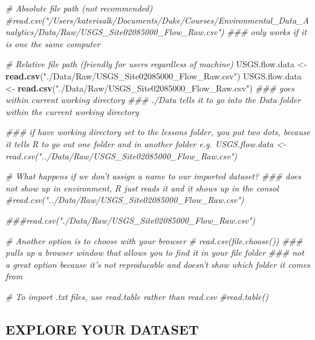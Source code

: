 \documentclass[]{article}
\newenvironment{Shaded}{\begin{snugshade}}{\end{snugshade}}
\newcommand{\CommentTok}[1]{\textcolor[rgb]{0.56,0.35,0.01}{\textit{#1}}}
\newcommand{\KeywordTok}[1]{\textcolor[rgb]{0.13,0.29,0.53}{\textbf{#1}}}
\newcommand{\NormalTok}[1]{#1}
\newcommand{\StringTok}[1]{\textcolor[rgb]{0.31,0.60,0.02}{#1}}
\begin{document}
\begin{Shaded}
\begin{Highlighting}[]
\CommentTok{# Absolute file path (not recommended)}
\CommentTok{#read.csv("/Users/katerisalk/Documents/Duke/Courses/Environmental_Data_Analytics/Data/Raw/USGS_Site02085000_Flow_Raw.csv")}
\CommentTok{### only works if it is one the same computer }

\CommentTok{# Relative file path (friendly for users regardless of machine)}
\NormalTok{USGS.flow.data <-}\StringTok{ }\KeywordTok{read.csv}\NormalTok{(}\StringTok{"./Data/Raw/USGS_Site02085000_Flow_Raw.csv"}\NormalTok{)}
\NormalTok{USGS.flow.data <-}\StringTok{ }\KeywordTok{read.csv}\NormalTok{(}\StringTok{"./Data/Raw/USGS_Site02085000_Flow_Raw.csv"}\NormalTok{)}
\CommentTok{### goes within current working directory }
\CommentTok{### ./Data tells it to go into the Data folder within the current working directory }

\CommentTok{### if have working directory set to the lessons folder, you put two dots, because it tells R to go out one folder and in another folder e.g. USGS.flow.data <- read.csv("../Data/Raw/USGS_Site02085000_Flow_Raw.csv")}

\CommentTok{# What happens if we don't assign a name to our imported dataset?}
\CommentTok{### does not show up in environment, R just reads it and it shows up in the consol }
\CommentTok{#read.csv("../Data/Raw/USGS_Site02085000_Flow_Raw.csv")}

\CommentTok{###read.csv("./Data/Raw/USGS_Site02085000_Flow_Raw.csv")}

\CommentTok{# Another option is to choose with your browser}
\CommentTok{# read.csv(file.choose())}
\CommentTok{### pulls up a browser window that allows you to find it in your file folder }
\CommentTok{### not a great option because it's not reproducable and doesn't show which folder it comes from }

\CommentTok{# To import .txt files, use read.table rather than read.csv}
\CommentTok{#read.table()}
\end{Highlighting}
\end{Shaded}

\hypertarget{explore-your-dataset}{%
\subsection{EXPLORE YOUR DATASET}\label{explore-your-dataset}}
\end{document}
